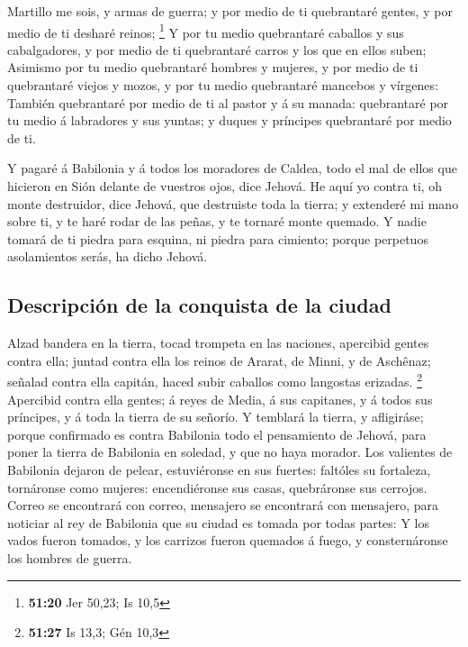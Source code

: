  Martillo me sois, y armas de guerra; y por medio de ti
quebrantaré gentes, y por medio de ti desharé reinos; \footnote{\textbf{51:20}
  Jer 50,23; Is 10,5}  Y por tu medio quebrantaré
caballos y sus cabalgadores, y por medio de ti quebrantaré carros y los
que en ellos suben;  Asimismo por tu medio quebrantaré
hombres y mujeres, y por medio de ti quebrantaré viejos y mozos, y por
tu medio quebrantaré mancebos y vírgenes:  También
quebrantaré por medio de ti al pastor y á su manada: quebrantaré por tu
medio á labradores y sus yuntas; y duques y príncipes quebrantaré por
medio de ti.

 Y pagaré á Babilonia y á todos los moradores de Caldea,
todo el mal de ellos que hicieron en Sión delante de vuestros ojos, dice
Jehová.  He aquí yo contra ti, oh monte destruidor, dice
Jehová, que destruiste toda la tierra; y extenderé mi mano sobre ti, y
te haré rodar de las peñas, y te tornaré monte quemado. 
Y nadie tomará de ti piedra para esquina, ni piedra para cimiento;
porque perpetuos asolamientos serás, ha dicho Jehová.

\hypertarget{descripciuxf3n-de-la-conquista-de-la-ciudad}{%
\subsection{Descripción de la conquista de la
ciudad}\label{descripciuxf3n-de-la-conquista-de-la-ciudad}}

 Alzad bandera en la tierra, tocad trompeta en las
naciones, apercibid gentes contra ella; juntad contra ella los reinos de
Ararat, de Minni, y de Aschênaz; señalad contra ella capitán, haced
subir caballos como langostas erizadas. \footnote{\textbf{51:27} Is
  13,3; Gén 10,3}  Apercibid contra ella gentes; á reyes
de Media, á sus capitanes, y á todos sus príncipes, y á toda la tierra
de su señorío.  Y temblará la tierra, y afligiráse;
porque confirmado es contra Babilonia todo el pensamiento de Jehová,
para poner la tierra de Babilonia en soledad, y que no haya morador.
 Los valientes de Babilonia dejaron de pelear,
estuviéronse en sus fuertes: faltóles su fortaleza, tornáronse como
mujeres: encendiéronse sus casas, quebráronse sus cerrojos.
 Correo se encontrará con correo, mensajero se encontrará
con mensajero, para noticiar al rey de Babilonia que su ciudad es tomada
por todas partes:  Y los vados fueron tomados, y los
carrizos fueron quemados á fuego, y consternáronse los hombres de
guerra.

